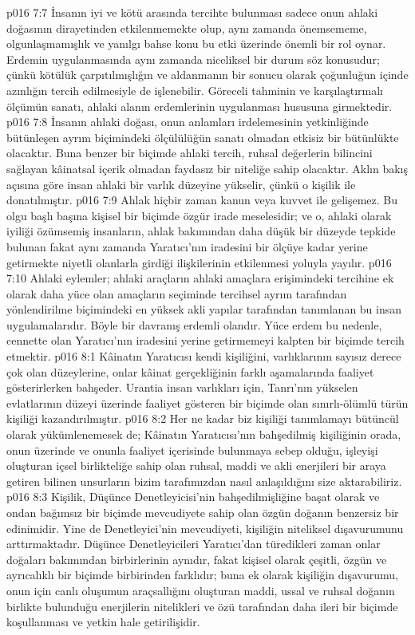 \vs p016 7:7 İnsanın iyi ve kötü arasında tercihte bulunması sadece onun ahlaki doğasının dirayetinden etkilenmemekte olup, aynı zamanda önemsememe, olgunlaşmamışlık ve yanılgı bahse konu bu etki üzerinde önemli bir rol oynar. Erdemin uygulanmasında aynı zamanda niceliksel bir durum söz konusudur; çünkü kötülük çarpıtılmışlığın ve aldanmanın bir sonucu olarak çoğunluğun içinde azınlığın tercih edilmesiyle de işlenebilir. Göreceli tahminin ve karşılaştırmalı ölçümün sanatı, ahlaki alanın erdemlerinin uygulanması hususuna girmektedir.
\vs p016 7:8 İnsanın ahlaki doğası, onun anlamları irdelemesinin yetkinliğinde bütünleşen ayrım biçimindeki ölçülülüğün sanatı olmadan etkisiz bir bütünlükte olacaktır. Buna benzer bir biçimde ahlaki tercih, ruhsal değerlerin bilincini sağlayan kâinatsal içerik olmadan faydasız bir niteliğe sahip olacaktır. Aklın bakış açısına göre insan ahlaki bir varlık düzeyine yükselir, çünkü o kişilik ile donatılmıştır.
\vs p016 7:9 Ahlak hiçbir zaman kanun veya kuvvet ile gelişemez. Bu olgu başlı başına kişisel bir biçimde özgür irade meselesidir; ve o, ahlaki olarak iyiliği özümsemiş insanların, ahlak bakımından daha düşük bir düzeyde tepkide bulunan fakat aynı zamanda Yaratıcı’nın iradesini bir ölçüye kadar yerine getirmekte niyetli olanlarla girdiği ilişkilerinin etkilenmesi yoluyla yayılır.
\vs p016 7:10 Ahlaki eylemler; ahlaki araçların ahlaki amaçlara erişimindeki tercihine ek olarak daha yüce olan amaçların seçiminde tercihsel ayrım tarafından yönlendirilme biçimindeki en yüksek akli yapılar tarafından tanımlanan bu insan uygulamalarıdır. Böyle bir davranış erdemli olandır. Yüce erdem bu nedenle, cennette olan Yaratıcı’nın iradesini yerine getirmemeyi kalpten bir biçimde tercih etmektir.
\vs p016 8:1 Kâinatın Yaratıcısı kendi kişiliğini, varlıklarının sayısız derece çok olan düzeylerine, onlar kâinat gerçekliğinin farklı aşamalarında faaliyet gösterirlerken bahşeder. Urantia insan varlıkları için, Tanrı’nın yükselen evlatlarının düzeyi üzerinde faaliyet gösteren bir biçimde olan sınırlı\hyp{}ölümlü türün kişiliği kazandırılmıştır.
\vs p016 8:2 Her ne kadar biz kişiliği tanımlamayı bütüncül olarak yükümlenemesek de; Kâinatın Yaratıcısı’nın bahşedilmiş kişiliğinin orada, onun üzerinde ve onunla faaliyet içerisinde bulunmaya sebep olduğu, işleyişi oluşturan içsel birlikteliğe sahip olan ruhsal, maddi ve akli enerjileri bir araya getiren bilinen unsurların bizim tarafımızdan nasıl anlaşıldığını size aktarabiliriz.
\vs p016 8:3 Kişilik, Düşünce Denetleyicisi’nin bahşedilmişliğine başat olarak ve ondan bağımsız bir biçimde mevcudiyete sahip olan özgün doğanın benzersiz bir edinimidir. Yine de Denetleyici’nin mevcudiyeti, kişiliğin niteliksel dışavurumunu arttırmaktadır. Düşünce Denetleyicileri Yaratıcı’dan türedikleri zaman onlar doğaları bakımından birbirlerinin aynıdır, fakat kişisel olarak çeşitli, özgün ve ayrıcalıklı bir biçimde birbirinden farklıdır; buna ek olarak kişiliğin dışavurumu, onun için canlı oluşumun araçsallığını oluşturan maddi, ussal ve ruhsal doğanın birlikte bulunduğu enerjilerin nitelikleri ve özü tarafından daha ileri bir biçimde koşullanması ve yetkin hale getirilişidir.
